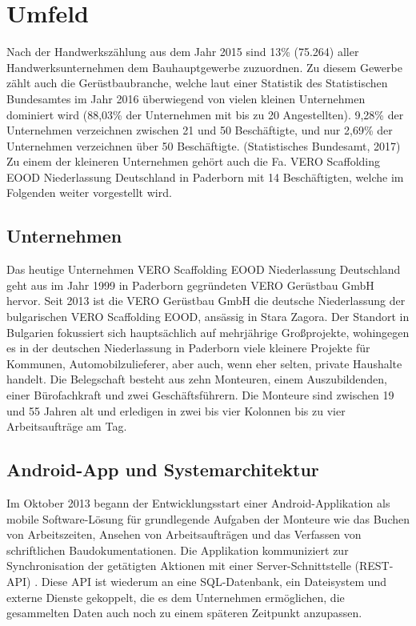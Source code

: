 \section{Umfeld}
Nach der Handwerkszählung aus dem Jahr 2015 sind 13\% (75.264) aller Handwerksunternehmen dem Bauhauptgewerbe zuzuordnen. Zu diesem Gewerbe zählt auch die Gerüstbaubranche, welche laut einer Statistik des Statistischen Bundesamtes im Jahr 2016 überwiegend von vielen kleinen Unternehmen dominiert wird (88,03\% der Unternehmen mit bis zu 20 Angestellten). 9,28\% der Unternehmen verzeichnen zwischen 21 und 50 Beschäftigte, und nur 2,69\% der Unternehmen verzeichnen über 50 Beschäftigte. (Statistisches Bundesamt, 2017) \\

Zu einem der kleineren Unternehmen gehört auch die Fa. VERO Scaffolding EOOD Niederlassung Deutschland in Paderborn mit 14 Beschäftigten, welche im Folgenden weiter vorgestellt wird.

\subsection{Unternehmen}
Das heutige Unternehmen VERO Scaffolding EOOD Niederlassung Deutschland geht aus im Jahr 1999 in Paderborn gegründeten VERO Gerüstbau GmbH hervor. 
Seit 2013 ist die VERO Gerüstbau GmbH die deutsche Niederlassung der bulgarischen VERO Scaffolding EOOD, ansässig in Stara Zagora. Der Standort in Bulgarien fokussiert sich hauptsächlich auf mehrjährige Großprojekte, wohingegen es in der deutschen Niederlassung in Paderborn viele kleinere Projekte für Kommunen, Automobilzulieferer, aber auch, wenn eher selten, private Haushalte handelt.
Die Belegschaft besteht aus zehn Monteuren, einem Auszubildenden, einer Bürofachkraft und zwei Geschäftsführern. Die Monteure sind zwischen 19 und 55 Jahren alt und erledigen in zwei bis vier Kolonnen bis zu vier Arbeitsaufträge am Tag.

\subsection{Android-App und Systemarchitektur}
Im Oktober 2013 begann der Entwicklungsstart einer Android-Applikation als mobile Software-Lösung für grundlegende Aufgaben der Monteure wie das Buchen von Arbeitszeiten, Ansehen von Arbeitsaufträgen und das Verfassen von schriftlichen Baudokumentationen. Die Applikation kommuniziert zur Synchronisation der getätigten Aktionen mit einer Server-Schnittstelle (REST-API) . Diese API ist wiederum an eine SQL-Datenbank, ein Dateisystem und externe Dienste gekoppelt, die es dem Unternehmen ermöglichen, die gesammelten Daten auch noch zu einem späteren Zeitpunkt anzupassen. \\

